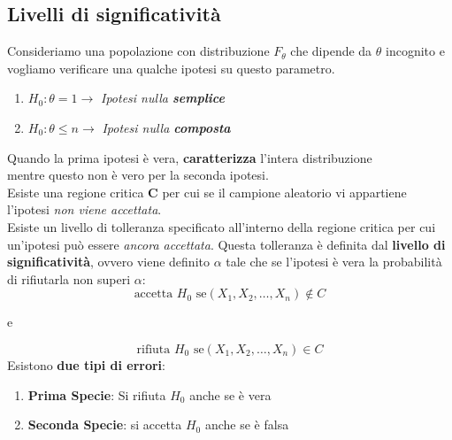\documentclass[]{article}
\begin{document}
    \subsection{Livelli di significatività}
    Consideriamo una popolazione con distribuzione $F_\theta$ che dipende da $\theta$ incognito e vogliamo verificare una qualche ipotesi su questo parametro.
    \begin{enumerate}
        \item $H_0 : \theta = 1 \longrightarrow$ \textit{Ipotesi nulla \textbf{semplice}}
        \item $H_0 : \theta \leq n \longrightarrow$ \textit{Ipotesi nulla \textbf{composta}}
    \end{enumerate}
    Quando la prima ipotesi è vera, \textbf{caratterizza} l'intera distribuzione \\
    mentre questo non è vero per la seconda ipotesi. 
    \\[2ex]
    Esiste una regione critica \textbf{C} per cui se il campione aleatorio vi appartiene l'ipotesi \textit{non viene accettata}. \\
    Esiste un livello di tolleranza specificato all'interno della regione critica per cui un'ipotesi può essere \textit{ancora accettata}.
    Questa tolleranza è definita dal \textbf{livello di significatività}, ovvero viene definito $\alpha$ tale che se l'ipotesi è vera la probabilità di rifiutarla non superi $\alpha$:
    \[ \text{accetta } H_0 \text{ se} (X_1, X_2, \ldots, X_n) \not \in C \]
    \centerline{e}
    \[ \text{rifiuta } H_0 \text{ se} (X_1, X_2, \ldots, X_n) \in C \]
    Esistono \textbf{due tipi di errori}:
    \begin{enumerate}
        \item \textbf{Prima Specie}: Si rifiuta $H_0$ anche se è vera
        \item \textbf{Seconda Specie}: si accetta $H_0$ anche se è falsa
    \end{enumerate}
\end{document}
